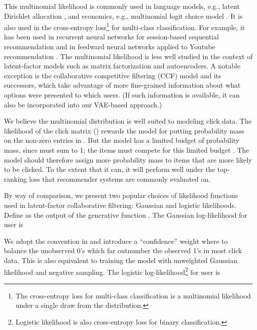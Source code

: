 \documentclass[sigconf]{acmart}
\begin{document}
This multinomial likelihood is commonly used in language models, e.g., latent Dirichlet 
allocation \citep{blei2003latent}, and economics, e.g., multinomial logit choice model \citep{mcfadden1973conditional}. 
It is also used in the cross-entropy loss\footnote{The cross-entropy loss for multi-class classification 
is a multinomial likelihood under a single draw from the distribution.} for multi-class classification. For example, it has been used in recurrent neural networks for 
session-based sequential recommendation \citep{hidasi2015session,tan2016improved,smirnova2017contextual,hidasi2017recurrent,chatzis2017recurrent} and 
in feedward neural networks applied to Youtube recommendation \citep{covington2016deep}. 
The multinomial likelihood is less well studied in the context of latent-factor models such as matrix factorization and autoencoders.
A notable exception is the collaborative competitive filtering (CCF) model \citep{yang2011collaborative} and its successors,
which take advantage of more fine-grained information about what options were presented to which users.
(If such information is available, it can also be incorporated into our \gls{VAE}-based approach.)

We believe the multinomial distribution is well suited to modeling click data.
The likelihood of the click matrix () rewards the model for putting probability mass on the non-zero entries in .
But the model has a limited budget of probability mass, since  must sum to 1;
the items must compete for this limited budget \citep{yang2011collaborative}.
The model should therefore assign more probability mass to items that are more likely to be clicked.
To the extent that it can, it will perform well under the top- ranking loss that recommender systems are commonly evaluated on.

By way of comparison, we present two popular choices of likelihood functions used in latent-factor collaborative filtering: Gaussian and logistic likelihoods.
Define  as the output of the generative function . The Gaussian log-likelihood for user  is

We adopt the convention in \citet{hu2008collaborative} and introduce a ``confidence'' weight  where  to balance the unobserved 0's which far outnumber the observed 1's in most click data. This is also equivalent to training the model with unweighted Gaussian likelihood and negative sampling. The logistic log-likelihood\footnote{Logistic likelihood is also cross-entropy loss for binary classification.} for user  is 
\end{document}
